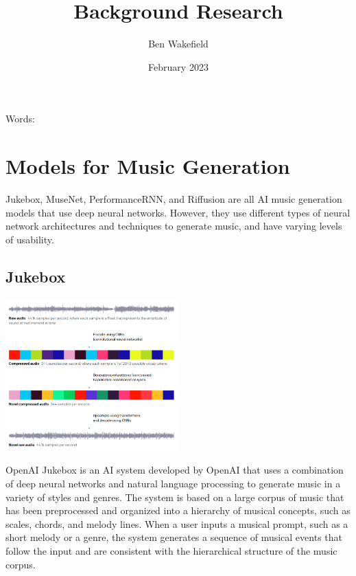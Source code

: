 \documentclass[]{MSword}
\title{Background Research}
\author{Ben Wakefield}
\date{February 2023}
\begin{document}
\maketitle
\begin{center}
    Words: \\ %
\end{center}

\section{Models for Music Generation}
\par{Jukebox, MuseNet, PerformanceRNN, and Riffusion are all AI music generation models that use deep neural networks. However, they use different types of neural network architectures and techniques to generate music, and have varying levels of usability.}

\subsection*{Jukebox}

\begin{center}
  \includegraphics[width=0.5\textwidth]{img/jukebox.png}
\end{center}

\par{OpenAI Jukebox\cite{jukebox} is an AI system developed by OpenAI that uses a combination of deep neural networks and natural language processing to generate music in a variety of styles and genres. The system is based on a large corpus of music that has been preprocessed and organized into a hierarchy of musical concepts, such as scales, chords, and melody lines. When a user inputs a musical prompt, such as a short melody or a genre, the system generates a sequence of musical events that follow the input and are consistent with the hierarchical structure of the music corpus.}
\end{document}
